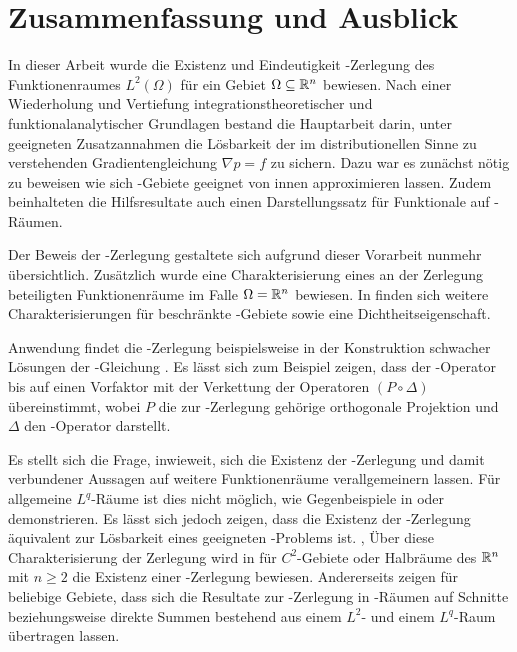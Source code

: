 \chapter{Zusammenfassung und Ausblick}

In dieser Arbeit wurde die Existenz und Eindeutigkeit \helmholtz\hyp{}Zerlegung des Funktionenraumes $L^2(\Omega)$ für ein Gebiet $\Omega \subseteq \mathbb{R}^n$ bewiesen.
Nach einer Wiederholung und Vertiefung integrationstheoretischer und funktionalanalytischer Grundlagen bestand die Hauptarbeit darin, unter geeigneten Zusatzannahmen die Lösbarkeit der im distributionellen Sinne zu verstehenden Gradientengleichung $\nabla p = f$ zu sichern.
Dazu war es zunächst nötig zu beweisen wie sich \lipschitz\hyp{}Gebiete geeignet von innen approximieren lassen.
Zudem beinhalteten die Hilfsresultate auch einen Darstellungssatz für Funktionale auf \sobolev\hyp{}Räumen.

Der Beweis der \helmholtz\hyp{}Zerlegung gestaltete sich aufgrund dieser Vorarbeit nunmehr übersichtlich.
Zusätzlich wurde eine Charakterisierung eines an der Zerlegung beteiligten Funktionenräume im Falle $\Omega = \mathbb{R}^n$ bewiesen.
In \cite[S.81ff., II.2.5]{sohr2001navier} finden sich weitere Charakterisierungen für beschränkte \lipschitz\hyp{}Gebiete sowie eine Dichtheitseigenschaft.

Anwendung findet die \helmholtz\hyp{}Zerlegung beispielsweise in der Konstruktion schwacher Lösungen der \stokes\hyp{}Gleichung \cite[S.129f.]{sohr2001navier}. 
Es lässt sich zum Beispiel zeigen, dass der \stokes\hyp{}Operator bis auf einen Vorfaktor mit der Verkettung der Operatoren $(P \circ \Delta)$ übereinstimmt, wobei $P$ die zur \helmholtz\hyp{}Zerlegung gehörige orthogonale Projektion und $\Delta$ den \laplace\hyp{}Operator darstellt.

Es stellt sich die Frage, inwieweit, sich die Existenz der \helmholtz\hyp{}Zerlegung und damit verbundener Aussagen auf weitere Funktionenräume verallgemeinern lassen.
Für allgemeine $L^q$\hyp{}Räume ist dies nicht möglich, wie Gegenbeispiele in \cite{maslennikova1986elliptic} oder \cite{bogovski1986decomposition} demonstrieren.
Es lässt sich jedoch zeigen, dass die Existenz der \helmholtz\hyp{}Zerlegung äquivalent zur Lösbarkeit eines geeigneten \neumann\hyp{}Problems ist. \cite{simader1992new}, \cite[S.146, Lemma III.1.2]{galdi2011navier}
Über diese Charakterisierung der Zerlegung wird in \cite[S.152, Theorem III.1.2]{galdi2011navier} für $C^2$-Gebiete oder Halbräume des $\mathbb{R}^n$ mit $n \geq 2$ die Existenz einer \helmholtz\hyp{}Zerlegung bewiesen.
Andererseits zeigen \cite{farwig05thehelmholtz,farwig05anLq} für beliebige Gebiete, dass sich die Resultate zur \helmholtz\hyp{}Zerlegung in \hilbert\hyp{}Räumen auf Schnitte beziehungsweise direkte Summen bestehend aus einem $L^2$- und einem $L^q$\hyp{}Raum übertragen lassen.

